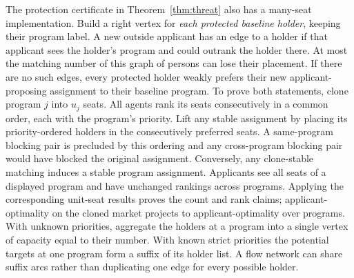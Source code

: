 The protection certificate in Theorem~\ref{thm:threat} also has a many-seat implementation. Build a right vertex for \emph{each protected baseline holder}, keeping their program label. A new outside applicant has an edge to a holder if that applicant sees the holder's program and could outrank the holder there. At most the matching number of this graph of persons can lose their placement. If there are no such edges, every protected holder weakly prefers their new applicant-proposing assignment to their baseline program. To prove both statements, clone program $j$ into $u_j$ seats. All agents rank its seats consecutively in a common order, each with the program's priority. Lift any stable assignment by placing its priority-ordered holders in the consecutively preferred seats. A same-program blocking pair is precluded by this ordering and any cross-program blocking pair would have blocked the original assignment. Conversely, any clone-stable matching induces a stable program assignment. Applicants see all seats of a displayed program and have unchanged rankings across programs. Applying the corresponding unit-seat results proves the count and rank claims; applicant-optimality on the cloned market projects to applicant-optimality over programs. With unknown priorities, aggregate the holders at a program into a single vertex of capacity equal to their number. With known strict priorities the potential targets at one program form a suffix of its holder list. A flow network can share suffix arcs rather than duplicating one edge for every possible holder.
